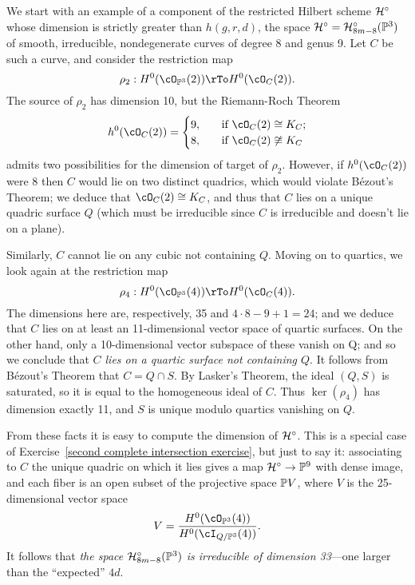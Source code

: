 We start with an example of a component of the restricted Hilbert scheme $\cH^\circ$ whose dimension is strictly greater than $h(g,r,d)$, the space $\cH^\circ = \cH^\circ_{8m-8}(\PP^3)$ of smooth, irreducible, nondegenerate curves of degree 8 and genus 9. Let $C$ be such a curve, and consider the restriction map
$$
\rho_2 : H^0(\cO_{\PP^3}(2)) \rTo H^0(\cO_C(2)).
$$
The source of $\rho_2$ has dimension 10, but the Riemann-Roch Theorem
\begin{align*}
h^0(\cO_C(2)) =
\begin{cases}
9, \quad &\text{if } \cO_C(2) \cong K_C; \\
8,  \quad &\text{if } \cO_C(2) \not\cong K_C
\end{cases}
\end{align*}
admits two possibilities for the dimension of target of $\rho_2$.
However, if $h^0(\cO_C(2))$ were 8 then $C$ would  lie on two distinct quadrics, which would violate B\'ezout's Theorem; we deduce that $\cO_C(2) \cong K_C$, and thus that $C$ lies on a unique quadric surface $Q$ (which must be irreducible since $C$ is irreducible and doesn't lie on a plane).

Similarly, $C$ cannot lie on any cubic not containing $Q$. Moving on to quartics, we look again at the restriction map
$$
\rho_4 : H^0(\cO_{\PP^3}(4)) \rTo H^0(\cO_C(4)).
$$
The dimensions here are, respectively, 35 and $4\cdot 8 - 9 + 1 = 24$; and we deduce that $C$ lies on at least an 11-dimensional vector space of quartic surfaces. On the other hand, only a 10-dimensional vector subspace of these vanish on Q; and so we conclude that \emph{$C$ lies on a quartic surface not containing $Q$}. It follows from B\'ezout's Theorem that $C = Q \cap S$. By Lasker's Theorem, the ideal $(Q,S)$ is saturated, so it is equal to the homogeneous ideal of $C$. Thus $\ker(\rho_4)$ has dimension exactly 11, and  $S$ is unique modulo quartics vanishing on $Q$.

From these facts it is easy to compute the dimension of  $\cH^\circ$. This is a special case of Exercise~\ref{second complete intersection exercise}, but just to say it: associating to $C$ the unique quadric on which it lies gives a map $\cH^\circ \to \PP^9$ with dense image, and each fiber is an open subset of the projective space $\PP V$, where $V$ is the 25-dimensional vector space
$$
V = \frac{H^0(\cO_{\PP^3}(4))}{H^0(\cI_{Q/\PP^3}(4))}.
$$
It follows that \emph{the space $\cH^\circ_{8m-8}(\PP^3)$ is irreducible of dimension 33}---one larger than the ``expected'' $4d$.


